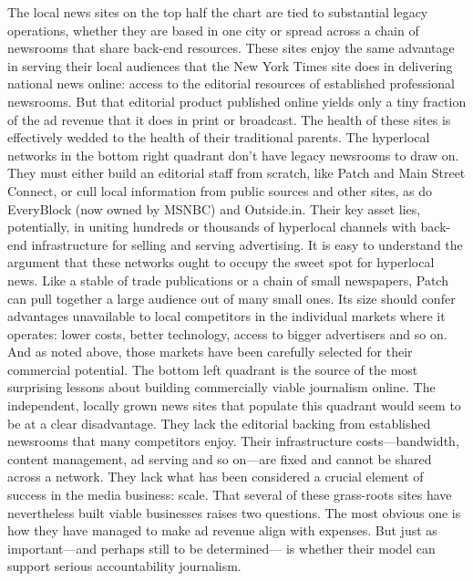 The local news sites on the top half the chart are tied to substantial legacy
operations, whether they are based in one city or spread across a chain of newsrooms
that share back-end resources. These sites enjoy the same advantage in
serving their local audiences that the New York Times site does in delivering
national news online: access to the editorial resources of established professional
newsrooms. But that editorial product published online yields only a tiny fraction
of the ad revenue that it does in print or broadcast. The health of these sites
is effectively wedded to the health of their traditional parents.
The hyperlocal networks in the bottom right quadrant don't have legacy
newsrooms to draw on. They must either build an editorial staff from scratch, like
Patch and Main Street Connect, or cull local information from public sources
and other sites, as do EveryBlock (now owned by MSNBC) and Outside.in.
Their key asset lies, potentially, in uniting hundreds or thousands of hyperlocal
channels with back-end infrastructure for selling and serving advertising.
It is easy to understand the argument that these networks ought to occupy
the sweet spot for hyperlocal news. Like a stable of trade publications or a chain
of small newspapers, Patch can pull together a large audience out of many small
ones. Its size should confer advantages unavailable to local competitors in the
individual markets where it operates: lower costs, better technology, access to bigger
advertisers and so on. And as noted above, those markets have been carefully
selected for their commercial potential.
The bottom left quadrant is the source of the most surprising lessons about
building commercially viable journalism online. The independent, locally grown
news sites that populate this quadrant would seem to be at a clear disadvantage.
They lack the editorial backing from established newsrooms that many competitors
enjoy. Their infrastructure costs—bandwidth, content management, ad serving
and so on—are fixed and cannot be shared across a network. They lack what
has been considered a crucial element of success in the media business: scale.
That several of these grass-roots sites have nevertheless built viable businesses
raises two questions. The most obvious one is how they have managed to make
ad revenue align with expenses. But just as important—and perhaps still to be determined—
is whether their model can support serious accountability journalism.

